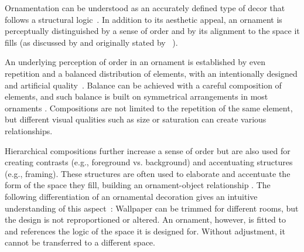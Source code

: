 Ornamentation can be understood as an accurately defined type of decor that follows a structural logic~\cite{ward_1896_tpo, moughtin_1999_udo, arbruzzo_2006_dec}. 
In addition to its aesthetic appeal, an ornament is perceptually distinguished by a sense of order and by its alignment to the space it fills (as discussed by \cite{wong_1998_cgf,gieseke_2017_ooo} and originally stated by \citeauthor*{ward_1896_tpo}~\cite{ward_1896_tpo, dresser_1875_pdd, arbruzzo_2006_dec}). 




An underlying perception of order in an ornament is established by even repetition and a balanced distribution of elements, with an intentionally designed and artificial quality~\cite{ward_1896_tpo}. Balance can be achieved with a careful composition of elements, and such balance is built on symmetrical arrangements in most ornaments \cite{gieseke_2017_ooo}. Compositions are not limited to the repetition of the same element, but different visual qualities such as size or saturation can create various relationships. 


Hierarchical compositions further increase a sense of order but are also used for creating contrasts (e.g., foreground vs. background) and accentuating structures (e.g., framing). These structures are often used to elaborate and accentuate the form of the space they fill, building an ornament-object relationship \cite{arbruzzo_2006_dec}. The following differentiation of an ornamental decoration gives an intuitive understanding of this aspect~\cite{arbruzzo_2006_dec}: Wallpaper can be trimmed for different rooms, but the design is not reproportioned or altered. An ornament, however, is fitted to and references the logic of the space it is designed for. Without adjustment, it cannot be transferred to a different space.

